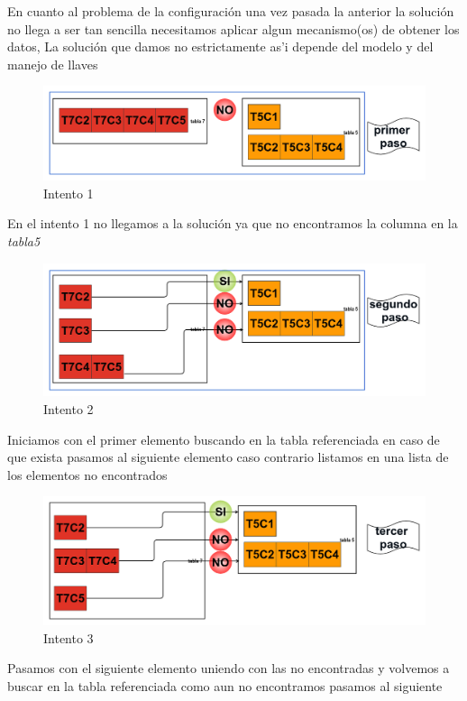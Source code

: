 En cuanto al problema de la configuraci\'on una vez pasada la anterior la soluci\'on no llega a ser tan sencilla necesitamos aplicar algun mecanismo(os) de obtener los datos, La soluci\'on que damos no estrictamente as'i depende del modelo y del manejo de llaves
\begin{figure}[H]
\centering
\includegraphics[scale=0.35]{images/paso1.png}
\caption{Intento 1}\label{intento1}
\end{figure}
En el intento 1 no llegamos a la soluci\'on ya que no encontramos la columna en la \textit{tabla5}
\begin{figure}[H]
\centering
\includegraphics[scale=0.35]{images/paso2.png}
\caption{Intento 2}\label{intento2}
\end{figure}
Iniciamos con el primer elemento buscando en la tabla referenciada en caso de que exista pasamos al siguiente elemento caso contrario listamos en una lista de los elementos no encontrados
\begin{figure}[H]
\centering
\includegraphics[scale=0.35]{images/paso3.png}
\caption{Intento 3}\label{intento3}
\end{figure}
Pasamos con el siguiente elemento uniendo con las no encontradas y volvemos a buscar en la tabla referenciada como aun no encontramos pasamos al siguiente
